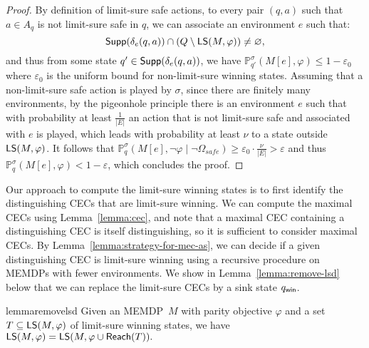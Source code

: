 \documentclass[a4paper,USenglish,cleveref, autoref, thm-restate]{lipics-v2021}
\let\emptyset\varnothing
\let\epsilon\varepsilon
\def\abs#1{\ensuremath{\lvert #1 \rvert}}
\newcommand*{\pr}{\mathbb{P}}
\newcommand\Supp{\textrm{\sf Supp}}
\newcommand\limitsure{\textrm{\sf LS}}
\newcommand\Reach{\textrm{\sf Reach}}
\def\winabsorb{q_{\sf win}}
\begin{document}
\begin{proof}
	By definition of limit-sure safe actions,
	to every pair $(q,a)$ such that $a \in A_q$ is not limit-sure safe in $q$, 
	we can associate an environment $e$ such that: 
	$$ \Supp(\delta_{e}(q,a)) \cap (Q \setminus \limitsure(M, \varphi)) \neq \emptyset,$$
	and thus from some state $q' \in \Supp(\delta_{e}(q,a))$, we have
	$\pr_{q'}^{\sigma}(M[e], \varphi) \leq 1-\epsilon_0$
	where $\epsilon_0$ is the uniform bound for non-limit-sure winning states.
	Assuming that a non-limit-sure safe action is played by $\sigma$, since there are finitely 
	many environments, by the pigeonhole principle there is an environment $e$ 
	such that with probability at least $\frac{1}{\abs{E}}$ an action
	that is not limit-sure safe and associated with $e$ is played,
	which leads with probability at least $\nu$ to a state outside $\limitsure(M, \varphi)$. 
	It follows that 
	$\pr_{q}^{\sigma}(M[e], \lnot \varphi \mid \lnot \Omega_{safe}) 
	\geq \epsilon_0 \cdot \frac{\nu}{\abs{E}} > \epsilon$
	and thus $\pr_{q}^{\sigma}(M[e], \varphi) < 1-\epsilon$,
	which concludes the proof.
\end{proof}

Our approach to compute the limit-sure winning states is to first identify the
distinguishing CECs that are limit-sure winning. We can compute
the maximal CECs using Lemma~\ref{lemma:cec}, and note that
a maximal CEC containing a distinguishing CEC is itself distinguishing, so it is sufficient
to consider maximal CECs. By Lemma~\ref{lemma:strategy-for-mec-as}, we can decide
if a given distinguishing CEC is limit-sure winning using 
a recursive procedure on MEMDPs with fewer environments.
We show in Lemma~\ref{lemma:remove-lsd} below that we can replace the limit-sure 
CECs by a sink state $\winabsorb$.

\begin{restatable}{lemma}{removelsd}
\label{lemma:remove-lsd}
	Given an MEMDP~$M$ with parity objective $\varphi$
	and a set $T \subseteq \limitsure(M, \varphi)$ of limit-sure winning states, 
	we have
	\(\limitsure(M, \varphi) = \limitsure(M, \varphi \cup \Reach(T)).\)
\end{restatable}
\end{document}
